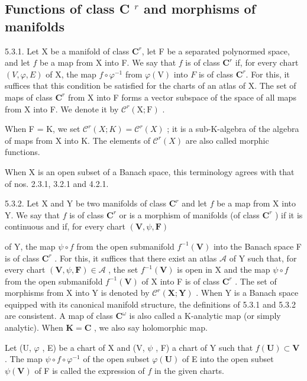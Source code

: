 \subsection{\texorpdfstring{Functions of class C \(^{r}\) and morphisms of manifolds}{Functions of class C\^{}\{r\} and morphisms of manifolds}}

5.3.1. Let X be a manifold of class \(\mathbf{C}^{r}\), let F be a separated polynormed space, and let \(f\) be a map from X into F. We say that \(f\) is of class \(\mathbf{C}^{r}\) if, for every chart \((V, \varphi, E)\) of X, the map \(f\circ\varphi^{-1}\) from \(\varphi(\mathrm V)\) into \(F\) is of class \(\mathbf{C}^{r}\). For this, it suffices that this condition be satisfied for the charts of an atlas of X. The set of maps of class \(\mathbf{C}^{r}\) from X into F forms a vector subspace of the space of all maps from X into F. We denote it by \(\mathcal{C}^{r}(\mathrm{X};\mathrm{F})\) .

When F = K, we set \(\mathcal{C}^{r}(X;K)=\mathcal{C}^{r}(X)\) ; it is a sub-K-algebra of the algebra of maps from X into K. The elements of \(\mathcal{C}^{r}(X)\) are also called morphic functions.

When X is an open subset of a Banach space, this terminology agrees with that of nos. 2.3.1, 3.2.1 and 4.2.1.

5.3.2. Let X and Y be two manifolds of class \(\mathbf{C}^{r}\) and let \(f\) be a map from X into Y. We say that \(f\) is of class \(\mathbf{C}^{r}\) or is a morphism of manifolds (of class \(\mathbf{C}^{r}\) ) if it is continuous and if, for every chart \((\mathbf{V},\psi ,\mathbf{F})\)

of Y, the map \(\psi \circ f\) from the open submanifold \(f^{-1}(\mathbf{V})\) into the Banach space F is of class \(\mathbf{C}^{r}\) . For this, it suffices that there exist an atlas \(\mathcal{A}\) of Y such that, for every chart \((\mathbf{V}, \psi, \mathbf{F}) \in \mathcal{A}\) , the set \(f^{-1}(\mathbf{V})\) is open in X and the map \(\psi \circ f\) from the open submanifold \(f^{-1}(\mathbf{V})\) of X into F is of class \(\mathbf{C}^{r}\) . The set of morphisms from X into Y is denoted by \(\mathcal{C}^{r}(\mathbf{X}; \mathbf{Y})\) . When Y is a Banach space equipped with its canonical manifold structure, the definitions of 5.3.1 and 5.3.2 are consistent. A map of class \(\mathbf{C}^{\omega}\) is also called a K-analytic map (or simply analytic). When \(\mathbf{K} = \mathbf{C}\) , we also say holomorphic map.

Let (U, \(\varphi\) , E) be a chart of X and (V, \(\psi\) , F) a chart of Y such that \(f(\mathbf{U}) \subset \mathbf{V}\) . The map \(\psi \circ f \circ \varphi^{-1}\) of the open subset \(\varphi(\mathbf{U})\) of E into the open subset \(\psi(\mathbf{V})\) of F is called the expression of \(f\) in the given charts.

